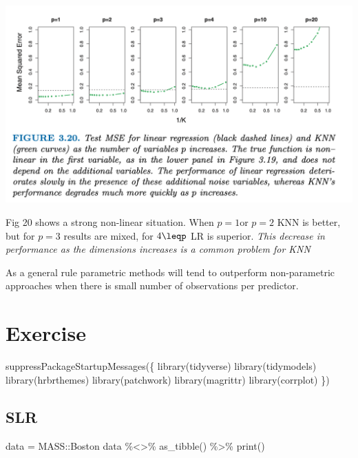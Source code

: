 \documentclass[
  letterpaper,
  DIV=11,
  numbers=noendperiod]{scrreprt}
\newenvironment{Shaded}{\begin{snugshade}}{\end{snugshade}}
\newcommand{\FunctionTok}[1]{\textcolor[rgb]{0.02,0.16,0.49}{#1}}
\newcommand{\NormalTok}[1]{\textcolor[rgb]{0.33,0.33,0.33}{#1}}
\newcommand{\OtherTok}[1]{\textcolor[rgb]{0.85,0.12,0.09}{#1}}
\newcommand{\SpecialCharTok}[1]{\textcolor[rgb]{0.00,0.46,0.62}{#1}}
\begin{document}
\includegraphics{fig3.20.png}

Fig 20 shows a strong non-linear situation. When \(p=1\)or \(p=2\) KNN
is better, but for \(p=3\) results are mixed, for \(4\leqp\) LR is
superior. \emph{This decrease in performance as the dimensions increases
is a common problem for KNN}

As a general rule parametric methods will tend to outperform
non-parametric approaches when there is small number of observations per
predictor.


\hypertarget{exercise}{%
\chapter{Exercise}\label{exercise}}

\begin{Shaded}
\begin{Highlighting}[]
\FunctionTok{suppressPackageStartupMessages}\NormalTok{(\{}
  \FunctionTok{library}\NormalTok{(tidyverse)}
  \FunctionTok{library}\NormalTok{(tidymodels)}
  \FunctionTok{library}\NormalTok{(hrbrthemes)}
  \FunctionTok{library}\NormalTok{(patchwork)}
  \FunctionTok{library}\NormalTok{(magrittr)}
  \FunctionTok{library}\NormalTok{(corrplot)}
\NormalTok{\})}
\end{Highlighting}
\end{Shaded}

\hypertarget{slr}{%
\section{SLR}\label{slr}}

\begin{Shaded}
\begin{Highlighting}[]
\NormalTok{data }\OtherTok{=}\NormalTok{ MASS}\SpecialCharTok{::}\NormalTok{Boston}
\NormalTok{data }\SpecialCharTok{\%\textless{}\textgreater{}\%} \FunctionTok{as\_tibble}\NormalTok{() }\SpecialCharTok{\%\textgreater{}\%} \FunctionTok{print}\NormalTok{()}
\end{Highlighting}
\end{Shaded}
\end{document}
